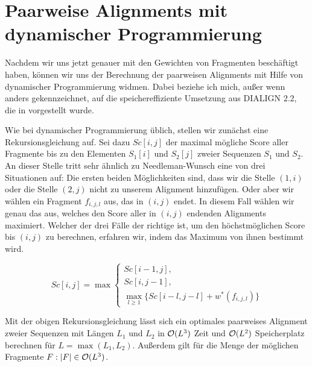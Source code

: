 \section{Paarweise Alignments mit dynamischer Programmierung}

Nachdem wir uns jetzt genauer mit den Gewichten von Fragmenten beschäftigt haben, können wir uns der Berechnung der paarweisen Alignments mit Hilfe von dynamischer Programmierung widmen. Dabei beziehe ich mich, außer wenn anders gekennzeichnet, auf die speichereffiziente Umsetzung aus DIALIGN 2.2, die in \cite{m02} vorgestellt wurde. 

Wie bei dynamischer Programmierung üblich, stellen wir zunächst eine Rekursionsgleichung auf. Sei dazu $Sc[i,j]$ der maximal mögliche Score aller Fragmente bis zu den Elementen $S_1[i]$ und $S_2[j]$ zweier Sequenzen $S_1$ und $S_2$. An dieser Stelle tritt sehr ähnlich zu Needleman-Wunsch eine von drei Situationen auf: Die ersten beiden Möglichkeiten sind, dass wir die Stelle $(1,i)$ oder die Stelle $(2,j)$ nicht zu unserem Alignment hinzufügen. Oder aber wir wählen ein Fragment $f_{i,j,l}$ aus, das in $(i,j)$ endet. In diesem Fall wählen wir genau das aus, welches den Score aller in $(i,j)$ endenden Alignments maximiert. Welcher der drei Fälle der richtige ist, um den höchstmöglichen Score bis $(i,j)$ zu berechnen, erfahren wir, indem das Maximum von ihnen bestimmt wird.

\begin{equation}\label{eq:dp_score2}
	Sc[i,j] = \max
	\begin{cases}
		Sc[i-1,j], \\
		Sc[i,j-1], \\
		\max_{l\geq 1}\{Sc[i\!-\!l,j\!-\!l] + w^*(f_{i,j,l})\}
	\end{cases}
\end{equation}

\begin{satz}
	Mit der obigen Rekursionsgleichung lässt sich ein optimales paarweises Alignment zweier Sequenzen mit Längen $L_1$ und $L_2$ in $\mathcal{O}(L^3)$ Zeit und $\mathcal{O}(L^2)$ Speicherplatz berechnen für $L = \max(L_1, L_2)$. Außerdem gilt für die Menge der möglichen Fragmente $F: |F| \in \mathcal{O}(L^3)$.
\end{satz}
	
